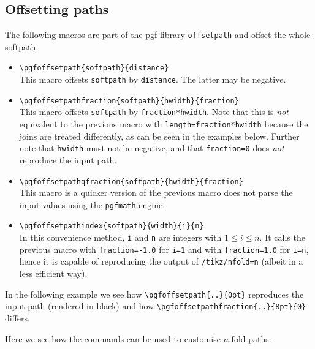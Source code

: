 \documentclass[12pt,a4paper]{article}
\theoremstyle{definition}
\begin{document}
\subsection{Offsetting paths}
The following macros are part of the pgf library \texttt{offsetpath} and offset the whole softpath.
\begin{itemize}
  \item \verb|\pgfoffsetpath{softpath}{distance}|\\%
    This macro offsets \texttt{softpath} by \texttt{distance}. The latter may be negative.
  \item \verb|\pgfoffsetpathfraction{softpath}{hwidth}{fraction}|\\%
    This macro offsets \texttt{softpath} by \texttt{fraction*hwidth}. Note that this is \emph{not} equivalent to the previous macro with \texttt{length=fraction*hwidth} because the joins are treated differently, as can be seen in the examples below. Further note that \texttt{hwidth} must not be negative, and that \texttt{fraction=0} does \emph{not} reproduce the input path.
  \item \verb|\pgfoffsetpathqfraction{softpath}{hwidth}{fraction}|\\%
    This macro is a quicker version of the previous macro  does not parse the input values using the \texttt{pgfmath}-engine.
  \item \verb|\pgfoffsetpathindex{softpath}{width}{i}{n}|\\%
    In this convenience method, \texttt{i} and \texttt{n} are integers with $1 \leq i \leq n$. It calls the previous macro with \texttt{fraction=-1.0} for \texttt{i=1} and with \texttt{fraction=1.0} for \texttt{i=n}, hence it is capable of reproducing the output of \texttt{/tikz/nfold=n} (albeit in a less efficient way).
\end{itemize}
In the following example we see how \verb|\pgfoffsetpath{..}{0pt}| reproduces the input path (rendered in black) and how \verb|\pgfoffsetpathfraction{..}{8pt}{0}| differs.
\begin{tkzexample}[latex=4cm]
\end{tkzexample}
Here we see how the commands can be used to customise $n$-fold paths:
\begin{tkzexample}[latex=4cm]
\end{tkzexample}
\end{document}
